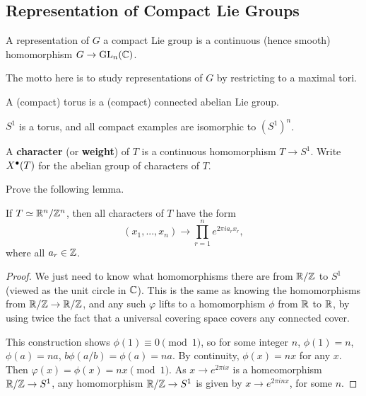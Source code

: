 \subsection{Representation of Compact Lie Groups}

\begin{defn}
A representation of $G$ a compact Lie group is a continuous (hence smooth)
homomorphism $G \rightarrow \mathrm{GL}_{n}({\mathbb{C}})$.
\end{defn}

The motto here is to study representations of $G$ by restricting to a maximal
tori.

\begin{defn}
A (compact) torus is a (compact) connected abelian Lie group.
\end{defn}

\begin{exmpl}
$S^1$ is a torus, and all compact examples are isomorphic to $(S^1)^n$.
\end{exmpl}

\begin{defn}
A \textbf{character} (or \textbf{weight}) of $T$ is a continuous homomorphism
$T \rightarrow S^1$. Write $X^\bullet(T)$ for the abelian group of characters of
$T$.
\end{defn}

\begin{ex}
Prove the following lemma.
\begin{lem}
If $T \simeq \mathbb{R}^n/\mathbb{Z}^n$, then all characters of $T$ have the form
\[ (x_1, ..., x_n) \rightarrow \prod_{r = 1}^n e^{2 \pi i a_r x_r}, \]
where all $a_r \in \mathbb{Z}$.
\end{lem}
\begin{proof}
We just need to know what homomorphisms there are from $\mathbb{R}/\mathbb{Z}$ to $S^1$ 
(viewed as the unit circle in $\mathbb{C}$). This is the same as knowing the 
homomorphisms from $\mathbb{R}/\mathbb{Z} \rightarrow \mathbb{R}/\mathbb{Z}$, and any such
$\varphi$ lifts to a homomorphism $\phi$ from $\mathbb{R}$ to $\mathbb{R}$, by using 
twice the fact that a universal covering space covers any connected cover.

This construction shows $\phi(1) \equiv 0 \pmod{1}$, so
for some integer $n$, $\phi(1) = n$, $\phi(a) = na$,
$b \phi(a/b) = \phi(a) = na$. By continuity,
$\phi(x) = nx$ for any $x$. Then $\varphi(x) = \phi(x) = nx \pmod{1}$. As
$x \rightarrow e^{2 \pi i x}$ is a homeomorphism $\mathbb{R}/\mathbb{Z} \rightarrow S^1$,
any homomorphism $\mathbb{R}/\mathbb{Z} \rightarrow S^1$ is given by
$x \rightarrow e^{2\pi i n x}$, for some $n$.
\end{proof}
\end{ex}

